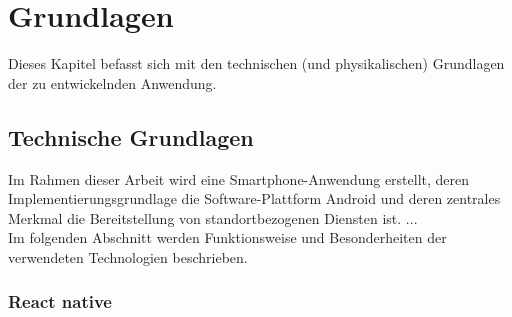 \chapter{\label{chap:grundlagen}Grundlagen}
Dieses Kapitel befasst sich mit den technischen (und physikalischen) Grundlagen der zu entwickelnden Anwendung.

\section{\label{sec:technGrundlagen}Technische Grundlagen}
Im Rahmen dieser Arbeit wird eine \gls{Smartphone}-Anwendung erstellt, deren Implementierungsgrundlage die Software-Plattform Android und deren zentrales Merkmal die Bereitstellung von standortbezogenen Diensten ist. ... \\
Im folgenden Abschnitt werden Funktionsweise und Besonderheiten der verwendeten Technologien beschrieben.

\subsection{React native}
